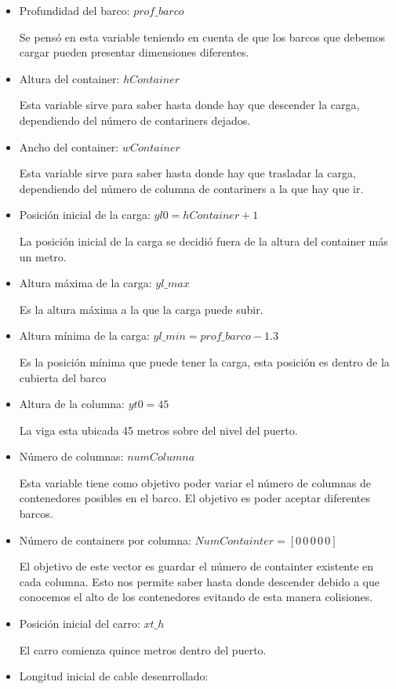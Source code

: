 \documentclass[journal]{IEEEtran}
\begin{document}
\begin{itemize}
 \item Profundidad del barco: $prof \_ barco$
 
 Se pensó en esta variable teniendo en cuenta de que los barcos que debemos cargar pueden
 presentar dimensiones diferentes.
 \item Altura del container: $hContainer$
 
 Esta variable sirve para saber hasta donde hay que descender la carga, dependiendo del 
 número de contariners dejados.
 \item Ancho del container: $wContainer$
 
 Esta variable sirve para saber hasta donde hay que trasladar la carga, dependiendo del 
 número de columna de contariners a la que hay que ir.
 
 \item Posición inicial de la carga: $yl0 =  hContainer + 1$
 
 La posición inicial de la carga se decidió fuera de la altura del container más un metro.
 \item Altura máxima de la carga: $yl\_max$
 
 Es la altura máxima a la que la carga puede subir. 
 \item Altura mínima de la carga: $yl\_min = prof\_barco - 1.3$
 
 Es la posición mínima que puede tener la carga, esta posición es dentro de la cubierta
 del barco
 \item Altura de la columna: $yt0 = 45 $
 
 La viga esta ubicada 45 metros sobre del nivel del puerto.
 \item Número de columnas: $numColumna$
 
 Esta variable tiene como objetivo poder variar el número de columnas de contenedores
 posibles en el barco. El objetivo es poder aceptar diferentes barcos.
 \item Número de containers por columna: $NumContainter = [0 \, 0 \, 0 \, 0 \, 0]$
 
 El objetivo de este vector es guardar el número de containter existente en cada columna.
 Esto nos permite saber hasta donde descender debido a que conocemos el alto de los 
 contenedores evitando de esta manera colisiones.
 \item Posición inicial del carro: $xt\_h$
 
 El carro comienza quince metros dentro del puerto.
 \item Longitud inicial de cable desenrrollado:
 

\end{itemize}
\end{document}
